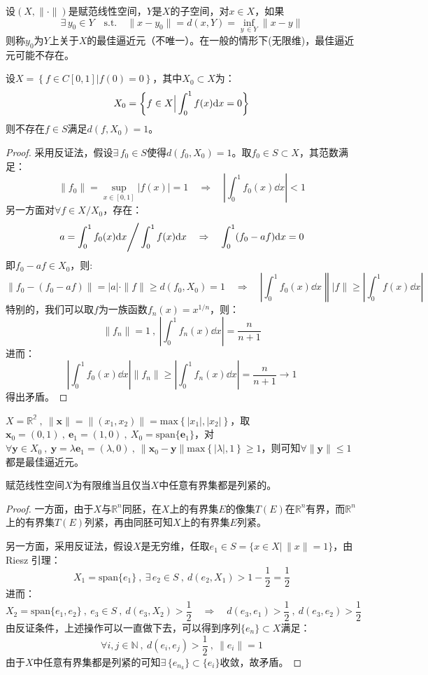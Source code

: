 \begin{definition}[最佳逼近元]
设$(X,\|\cdot\|)$是赋范线性空间，$Y$是$X$的子空间，对$x \in X$，如果
\[\exists \, y_0 \in Y \quad \text{s.t.} \quad \|x-y_0\|=d(x,Y)=\mathop \text{inf}\limits_{y \, \in Y}\|x-y\|\]
则称$y_0$为$Y$上关于$X$的最佳逼近元（不唯一）。在一般的情形下(无限维)，最佳逼近元可能不存在。
\end{definition}
\begin{example}
\quad 设$X=\left\{f \in C[0,1]|f(0)=0\right\}$，其中$X_0 \subset X$为：
\[X_0=\left\{f \in X \Big{|} \int_0^1f(x)\dd x=0\right\}\]
则不存在$f \in S$满足$d(f,X_0)=1$。
\end{example}
\begin{proof}
采用反证法，假设$\exists \, f_0 \in S$使得$d(f_0,X_0)=1$。取$f_0 \in S \subset X$，其范数满足：
\[\|f_0\|=\mathop \text{sup}\limits_{x \in [0,1]}|f(x)|=1 \quad \Rightarrow \quad \left|\int_0^1f_0(x)\dd x\right|<1\]
另一方面对$\forall f \in X/X_0$，存在：
\[a=\int_0^1f_0(x)\dd x \Bigg{/} \int_0^1f(x)\dd x \quad \Rightarrow \quad \int_0^1(f_0-af)\dd x=0\]
即$f_0-af \in X_0$，则:
\[\|f_0-(f_0-af)\|=|a|\cdot\|f\| \geq d(f_0,X_0)=1 \quad \Rightarrow \quad \left|\int_0^1f_0(x)\dd x\right\||f\| \geq \left|\int_0^1f(x)\dd x\right|\]
特别的，我们可以取$f$为一族函数$f_n(x)=x^{1/n}$，则：
\[\|f_n\|=1 \ , \ \left|\int_0^1f_n(x)\dd x\right|=\frac{n}{n+1}\]
进而：
\[\left|\int_0^1f_0(x)\dd x\right| \|f_n\| \geq \left|\int_0^1f_n(x)\dd x\right|=\frac{n}{n+1} \to 1\]
得出矛盾。
\end{proof}

\begin{example}
 \quad $X=\mathbb{R^2} \ , \ \|\mathbf{x}\|=\|(x_1,x_2)\|=\text{max}\left\{|x_1|,|x_2|\right\}$，取$\mathbf{x}_0=(0,1) \ , \ \mathbf{e}_1=(1,0) \ , \ X_0=\text{span}\{\mathbf{e}_1\}$，对$\forall \mathbf{y} \in X_0 \ , \ \mathbf{y}=\lambda \mathbf{e}_1=(\lambda,0) \ , \ \|\mathbf{x}_0-\mathbf{y}\|\text{max}\left\{|\lambda|,1\right\} \geq 1$，则可知$\forall \|\mathbf{y}\| \leq 1$都是最佳逼近元。
\end{example}

\begin{theorem}
赋范线性空间$X$为有限维当且仅当$X$中任意有界集都是列紧的。
\end{theorem}
\begin{proof}
一方面，由于$X$与$\mathbb{R}^n$同胚，在$X$上的有界集$E$的像集$T(E)$在$\mathbb{R}^n$有界，而$\mathbb{R}^n$上的有界集$T(E)$列紧，再由同胚可知$X$上的有界集$E$列紧。

另一方面，采用反证法，假设$X$是无穷维，任取$e_1 \in S=\{x \in X | \, \|x\|=1\}$，由 Riesz 引理：
\[X_1=\text{span}\{e_1\} \ , \ \exists \, e_2 \in S \ , \ d(e_2,X_1)>1-\frac{1}{2}=\frac{1}{2}\]
进而：
\[X_2=\text{span}\{e_1,e_2\} \ , \ e_3 \in S \ , \ d(e_3,X_2)>\frac{1}{2} \quad \Rightarrow \quad d(e_3,e_1)>\frac{1}{2} \ , \ d(e_3,e_2)>\frac{1}{2}\]
由反证条件，上述操作可以一直做下去，可以得到序列$\{e_n\} \subset X$满足：
\[\forall i,j \in \mathbb{N} \ , \ d(e_i,e_j)>\frac{1}{2} \ , \ \|e_i\|=1\]
由于$X$中任意有界集都是列紧的可知$\exists \, \{e_{n_k}\} \subset \{e_i\}$收敛，故矛盾。
\end{proof}